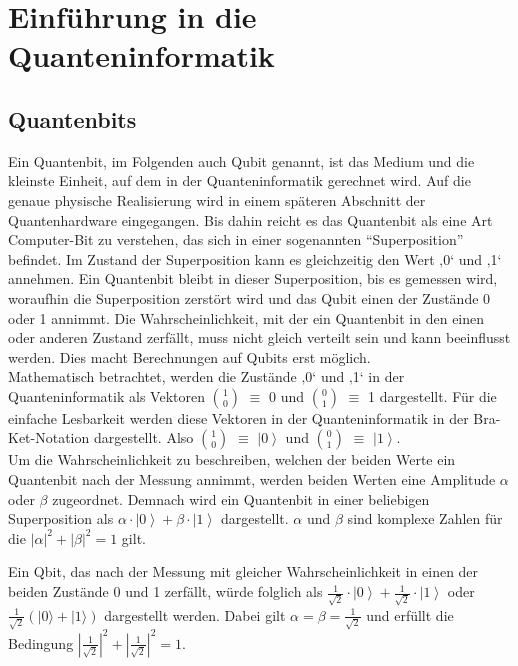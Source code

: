 \section{Einführung in die Quanteninformatik} 
\label{sec:Einführung in die Quanteninformatik}
\subsection{Quantenbits}
Ein Quantenbit, im Folgenden auch Qubit genannt, ist das Medium und die kleinste Einheit, auf dem in der Quanteninformatik gerechnet wird. Auf die genaue physische Realisierung wird in einem späteren Abschnitt der Quantenhardware eingegangen. Bis dahin reicht es das Quantenbit als eine Art Computer-Bit zu verstehen, das sich in einer sogenannten ``Superposition'' befindet. Im Zustand der Superposition kann es gleichzeitig den Wert ‚0‘ und ‚1‘ annehmen. Ein Quantenbit bleibt in dieser Superposition, bis es gemessen wird, woraufhin die Superposition zerstört wird und das Qubit einen der Zustände 0 oder 1 annimmt. Die Wahrscheinlichkeit, mit der ein Quantenbit in den einen oder anderen Zustand zerfällt, muss nicht gleich verteilt sein und kann beeinflusst werden. Dies macht Berechnungen auf Qubits erst möglich.\\

Mathematisch betrachtet, werden die Zustände ‚0‘ und ‚1‘ in der Quanteninformatik als Vektoren \(\binom{1}{0}\) $\equiv$ 0 und \(\binom{0}{1}\) $\equiv$ 1 dargestellt. Für die einfache Lesbarkeit werden diese Vektoren in der Quanteninformatik in der Bra-Ket-Notation dargestellt.
Also \(\binom{1}{0}\) $\equiv$ $\left|0\right\rangle$ und \(\binom{0}{1}\) $\equiv$ $\left|1\right\rangle$. \\

Um die Wahrscheinlichkeit zu beschreiben, welchen der beiden Werte ein Quantenbit nach der Messung annimmt, werden beiden Werten eine Amplitude $\alpha$ oder $\beta$ zugeordnet. Demnach wird ein Quantenbit in einer beliebigen Superposition als $\alpha\cdot\left|0\right\rangle+\beta\cdot\left|1\right\rangle$ dargestellt. $\alpha$ und $\beta$ sind komplexe Zahlen für die $\left|\alpha\right|^2+\left|\beta\right|^2=1$ gilt. 

Ein Qbit, das nach der Messung mit gleicher Wahrscheinlichkeit in einen der beiden Zustände 0 und 1 zerfällt, würde folglich als $\frac{1}{\sqrt2}\cdot\left|0\right\rangle+\frac{1}{\sqrt2}\cdot\left|1\right\rangle$ oder $\frac{1}{\sqrt{2}}(\left|0\right.\rangle+\left|1\right.\rangle)$ dargestellt werden. Dabei gilt $\alpha = \beta = \frac{1}{\sqrt2}$ und erfüllt die Bedingung $\left|\frac{1}{\sqrt2}\right|^2+\left|\frac{1}{\sqrt2}\right|^2=1$.\\

